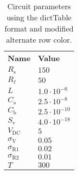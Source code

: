 \begin{table}[H]
\centering
\begin{tabular}[c]{ll}
\textbf{Name} & \textbf{Value} \\ 
\rowcolor{mygray}
$R_{\mathrm{s}}$ &$150$ \\ 
$R_{\ell}$ &$50$ \\ 
\rowcolor{mygray}
$L$ &$1.0 \cdot 10^{-6}$ \\ 
$C_{\mathrm{a}}$ &$2.5 \cdot 10^{-8}$ \\ 
\rowcolor{mygray}
$C_{\mathrm{b}}$ &$2.5 \cdot 10^{-10}$ \\ 
$S_{\mathrm{v}}$ &$4.0 \cdot 10^{-18}$ \\ 
\rowcolor{mygray}
$V_{\mathrm{DC}}$ &$5$ \\ 
$\sigma_{\mathrm{V}}$ &$0.05$ \\ 
\rowcolor{mygray}
$\sigma_{\mathrm{R1}}$ &$0.02$ \\ 
$\sigma_{\mathrm{R2}}$ &$0.01$ \\ 
\rowcolor{mygray}
$T$ &$300$ \\ 
\end{tabular}
\caption{Circuit parameters using the dictTable format and modified alternate row color.}
\label{tab-mydct}
\end{table}

